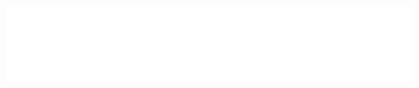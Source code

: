 \documentclass[
]{beamer}
\begin{document}



\begingroup
{}
\begin{frame}[plain]
\vfill
\centering
\includegraphics[width=\textwidth]{institution-english}
\vfill
\end{frame}
\endgroup
\end{document}

